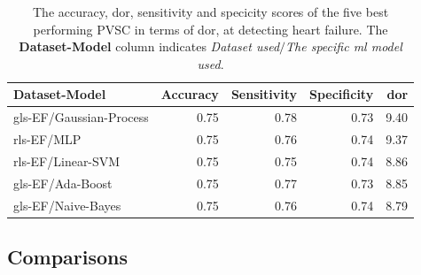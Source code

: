 \begin{table}
    \centering
    \begin{tabular}{lrrrr}
        \toprule
        Dataset-Model           &  Accuracy &  Sensitivity &  Specificity &  \acrshort{dor} \\
        \midrule
        gls-EF/Gaussian-Process &      0.75 &         0.78 &         0.73 & 9.40 \\
        rls-EF/MLP              &      0.75 &         0.76 &         0.74 & 9.37 \\
        rls-EF/Linear-SVM       &      0.75 &         0.75 &         0.74 & 8.86 \\
        gls-EF/Ada-Boost        &      0.75 &         0.77 &         0.73 & 8.85 \\
        gls-EF/Naive-Bayes      &      0.75 &         0.76 &         0.74 & 8.79 \\
        \bottomrule
    \end{tabular}
    \caption{The accuracy, \acrshort{dor}, sensitivity and specicity scores of the five best performing PVSC in terms of \acrshort{dor}, at detecting heart failure.
             The \textbf{Dataset-Model} column indicates \textit{Dataset used}$/$\textit{The specific \acrshort{ml} model used}.}
    \label{tab:pvmlc_hf_dor_sens_spec_dis}
\end{table}

\clearpage
\subsection{Comparisons}

